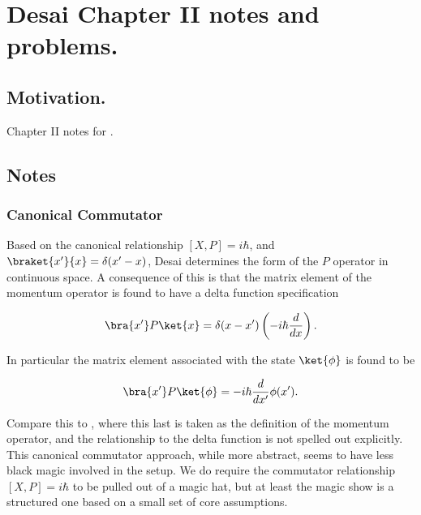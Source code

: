 
%

\chapter{Desai Chapter II notes and problems.}
\label{chap:desaiCh2}
{}
\date{Sept 19, 2010}

\beginArtWithToc

\section{Motivation.}

Chapter II notes for \cite{desai2009quantum}.

\section{Notes}
\subsection{Canonical Commutator}

Based on the canonical relationship $[X,P] = i\hbar$, and $\braket{x'}{x} = \delta(x'-x)$, Desai determines the form of the $P$ operator in continuous space.  A consequence of this is that the matrix element of the momentum operator is found to have a delta function specification

\begin{align*}
\bra{x'} P \ket{x} = \delta(x - x') \left( -i \hbar \frac{d}{dx} \right).
\end{align*}

In particular the matrix element associated with the state $\ket{\phi}$ is found to be

\begin{align*}
\bra{x'} P \ket{\phi} = -i \hbar \frac{d}{dx'} \phi(x').
\end{align*}

Compare this to \cite{liboff2003iqm}, where this last is taken as the definition of the momentum operator, and the relationship to the delta function is not spelled out explicitly.  This canonical commutator approach, while more abstract, seems to have less black magic involved in the setup.  We do require the commutator relationship $[X,P] = i\hbar$ to be pulled out of a magic hat, but at least the magic show is a structured one based on a small set of core assumptions.

